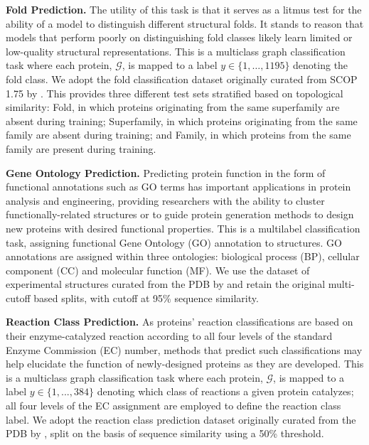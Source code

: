 \textbf{Fold Prediction. }
The utility of this task is that it serves as a litmus test for the ability of a model to distinguish different structural folds. It stands to reason that models that perform poorly on distinguishing fold classes likely learn limited or low-quality structural representations.
This is a multiclass graph classification task where each protein, $\mathcal{G}$, is mapped to a label $y \in \{1, \dots, 1195\}$ denoting the fold class.
We adopt the fold classification dataset originally curated from SCOP 1.75 by \citep{hou2017}. This provides three different test sets stratified based on topological similarity: Fold, in which proteins originating from the same superfamily are absent during training; Superfamily, in which proteins originating from the same family are absent during training; and Family, in which proteins from the same family are present during training.

\textbf{Gene Ontology Prediction. }
Predicting protein function in the form of functional annotations such as GO terms has important applications in protein analysis and engineering, providing researchers with the ability to cluster functionally-related structures or to guide protein generation methods to design new proteins with desired functional properties.
This is a multilabel classification task, assigning functional Gene Ontology (GO) annotation to structures. GO annotations are assigned within three ontologies: biological process (BP), cellular component (CC) and molecular function (MF). We use the dataset of experimental structures curated from the PDB by \citet{Gligorijevi2021} and retain the original multi-cutoff based splits, with cutoff at 95\% sequence similarity. 

\textbf{Reaction Class Prediction. } 
As proteins' reaction classifications are based on their enzyme-catalyzed reaction according to all four levels of the standard Enzyme Commission (EC) number, methods that predict such classifications may help elucidate the function of newly-designed proteins as they are developed.
This is a multiclass graph classification task where each protein, $\mathcal{G}$, is mapped to a label $y \in {\{1, ..., 384\}}$ denoting which class of reactions a given protein catalyzes; all four levels of the EC assignment are employed to define the reaction class label.
We adopt the reaction class prediction dataset originally curated from the PDB by \citet{hermosilla2020intrinsic}, split on the basis of sequence similarity using a 50\% threshold.

